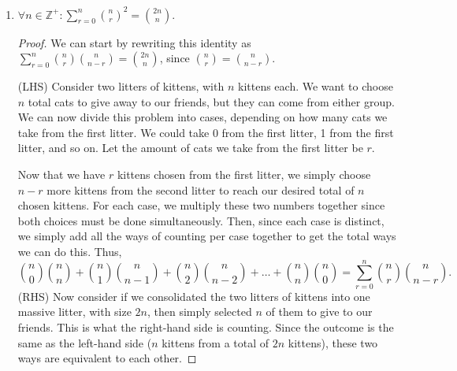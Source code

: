 \documentclass{article}
\begin{document}
\begin{enumerate}
\begin{proof}
        of all the money that you're giving out to your kids. The ways of doing this are what the left-hand side is counting. The result is $r$ kids who are all receiving money, and 1 kid who is giving you all their money.\par 
        (RHS) Now consider if we pick the child who will lose money first. Then, we'll be left with $n-1$ kids total. If we want $r$ children to receive money, we simply take $r$ of them from the reamining $n-1$. This 
        is what the right-hand side is counting. The result is $r$ out of $n$ total kids receiving money, and 1 kid who is losing all of their money. Thus, it is equivalent to the left-hand side. 
    \end{proof}
    \item $\displaystyle \forall n \in \mathbb{Z}^{+} : \sum_{r=0}^{n} {\binom{n}{r}}^2 = \binom{2n}{n}$.\begin{proof}
        We can start by rewriting this identity as $\displaystyle \sum_{r=0}^n \binom{n}{r} \binom{n}{n-r} = \binom{2n}{n}$, since $\displaystyle \binom{n}{r} = \binom{n}{n-r}$.\par 
        (LHS) Consider two litters of kittens, with $n$ kittens each. We want to choose $n$ total cats to give away to our friends, but they can come from either group. We can now divide this problem into 
        cases, depending on how many cats we take from the first litter. We could take 0 from the first litter, 1 from the first litter, and so on. Let the amount of cats we take from the 
        first litter be $r$.\par Now that we have $r$ kittens chosen from the first litter, we simply choose $n-r$ more kittens from the second litter to reach our desired total of $n$ chosen kittens. For each case, we multiply these two numbers together since both choices must be done simultaneously.
        Then, since each case is distinct, we simply add all the ways of counting per case together to get the total ways we can do this. Thus,\[
            \binom{n}{0} \binom{n}{n} + \binom{n}{1} \binom{n}{n-1} + \binom{n}{2} \binom{n}{n-2} +\hdots + \binom{n}{n} \binom{n}{0} = \sum_{r=0}^n \binom{n}{r} \binom{n}{n-r}.  
        \] 
        (RHS) Now consider if we consolidated the two litters of kittens into one massive litter, with size $2n$, then simply selected $n$ of them to give to our friends. This is what the 
        right-hand side is counting. Since the outcome is the same as the left-hand side ($n$ kittens from a total of $2n$ kittens), these two ways are equivalent to each other.
    \end{proof} 
\end{enumerate} 
\end{document}
